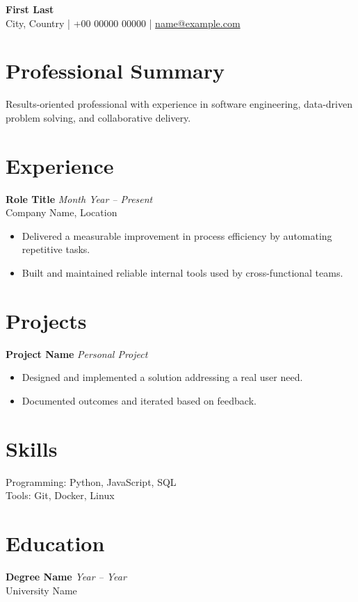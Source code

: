 \documentclass[a4paper,10pt]{article}
\begin{document}
{\LARGE\textbf{First Last}}\\
City, Country \quad | \quad +00 00000 00000 \quad | \quad \href{mailto:name@example.com}{name@example.com}

\section*{Professional Summary}
Results-oriented professional with experience in software engineering, data-driven problem solving, and collaborative delivery.

\section*{Experience}
\textbf{Role Title} \hfill \textit{Month Year -- Present}\\
Company Name, Location
\begin{itemize}[leftmargin=*, itemsep=0.2em]
  \item Delivered a measurable improvement in process efficiency by automating repetitive tasks.
  \item Built and maintained reliable internal tools used by cross-functional teams.
\end{itemize}

\section*{Projects}
\textbf{Project Name} \hfill \textit{Personal Project}
\begin{itemize}[leftmargin=*, itemsep=0.2em]
  \item Designed and implemented a solution addressing a real user need.
  \item Documented outcomes and iterated based on feedback.
\end{itemize}

\section*{Skills}
Programming: Python, JavaScript, SQL\\
Tools: Git, Docker, Linux

\section*{Education}
\textbf{Degree Name} \hfill \textit{Year -- Year}\\
University Name
\end{document}

